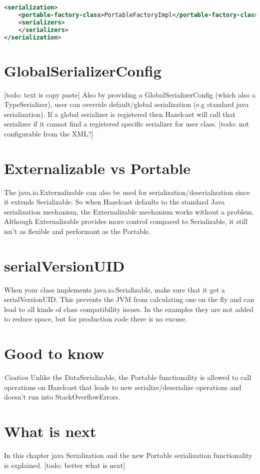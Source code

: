 \begin{lstlisting}[language=xml]
<serialization>
    <portable-factory-class>PortableFactoryImpl</portable-factory-class>
    <serializers>
    </serializers>
</serialization>
\end{lstlisting}

\section{GlobalSerializerConfig}
[todo: text is copy paste]
Also by providing a GlobalSerializerConfig (which also a TypeSerializer), user can override default/global serialization (e.g standard java serialization). If a global serializer is registered then Hazelcast will call that serializer if it cannot find a registered specific serializer for user class. [todo: not configurable from the XML?]

\section{Externalizable vs Portable}
The java.io.Externalizable can also be used for serialization/deserialization since it extends Serializable. So when Hazelcast defaults to the standard Java serialization mechanism, the Externalizable mechanism works without a problem. Although Externalizable provides more control compared to Serializable, it still isn't as flexible and performant as the Portable.

\section{serialVersionUID} 
When your class implements java.io.Serializable, make sure that it get a serialVersionUID. This prevents the JVM from calculating one on the fly and can lead to all kinds of class compatibility issues. In the examples they are not added to reduce space, but for production code there is no excuse.

\section{Good to know}

\emph{Caution}  Unlike the DataSerializable, the Portable functionality is allowed to call operations on Hazelcast that leads to new serialize/deserialize operations and doesn't run into StackOverflowErrors.

\section{What is next}
In this chapter java Serialization and the new Portable serialization functionality is explained. [todo: better what is next]